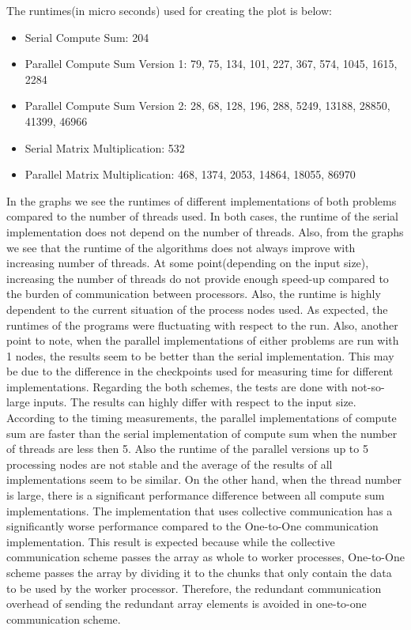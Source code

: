 \documentclass{article}
\begin{document}
\quad The runtimes(in micro seconds) used for creating the plot is below:
\begin{itemize}
    \item {Serial Compute Sum: 204}
    \item {Parallel Compute Sum Version 1: 79, 75, 134, 101, 227, 367, 574, 1045, 1615, 2284}
    \item {Parallel Compute Sum Version 2: 28, 68, 128, 196, 288, 5249, 13188, 28850, 41399, 46966}
    \item {Serial Matrix Multiplication: 532}
    \item {Parallel Matrix Multiplication: 468, 1374, 2053, 14864, 18055, 86970}
\end{itemize}
\qquad In the graphs we see the runtimes of different implementations of both problems compared to the number of threads used. In both cases, the runtime of the serial implementation does not depend on the number of threads. Also, from the graphs we see that the runtime of the algorithms does not always improve with increasing number of threads. At some point(depending on the input size), increasing the number of threads do not provide enough speed-up compared to the burden of communication between processors. Also, the runtime is highly dependent to the current situation of the process nodes used. As expected, the runtimes of the programs were fluctuating with respect to the run. Also, another point to note, when the parallel implementations of either problems are run with 1 nodes, the results seem to be better than the serial implementation. This may be due to the difference in the checkpoints used for measuring time for different implementations. Regarding the both schemes, the tests are done with not-so-large inputs. The results can highly differ with respect to the input size. \\
\null\qquad According to the timing measurements, the parallel implementations of compute sum are faster than the serial implementation of compute sum when the number of threads are less then 5. Also the runtime of the parallel versions up to 5 processing nodes are not stable and the average of the results of all implementations seem to be similar. On the other hand, when the thread number is large, there is a significant performance difference between all compute sum implementations. The implementation that uses collective communication has a significantly worse performance compared to the One-to-One communication implementation. This result is expected because while the collective communication scheme passes the array as whole to worker processes, One-to-One scheme passes the array by dividing it to the chunks that only contain the data to be used by the worker processor. Therefore, the redundant communication overhead of sending the redundant array elements is avoided in one-to-one communication scheme. \\
\end{document}
